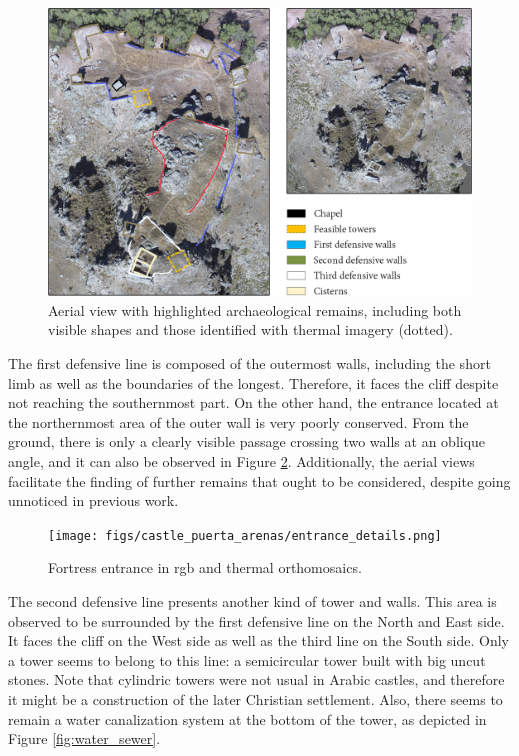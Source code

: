 \begin{figure}[htbp]
    \centering
    \includegraphics[width=\linewidth]{figs/castle_puerta_arenas/castle_annotations.png}
    \caption{Aerial view with highlighted archaeological remains, including both visible shapes and those identified with thermal imagery (dotted). }
    \label{fig:archaeological_remains_structure}
\end{figure}

The first defensive line is composed of the outermost walls, including the short limb as well as the boundaries of the longest. Therefore, it faces the cliff despite not reaching the southernmost part. On the other hand, the entrance located at the northernmost area of the outer wall is very poorly conserved. From the ground, there is only a clearly visible passage crossing two walls at an oblique angle, and it can also be observed in Figure \ref{fig:entrance_details}. Additionally, the aerial views facilitate the finding of further remains that ought to be considered, despite going unnoticed in previous work. 

\begin{figure}[htbp]
    \centering
    \texttt{[image: figs/castle\_puerta\_arenas/entrance\_details.png]}
    \caption{Fortress entrance in \acrshort{rgb} and thermal orthomosaics.}
    \label{fig:entrance_details}
\end{figure}

The second defensive line presents another kind of tower and walls. This area is observed to be surrounded by the first defensive line on the North and East side. It faces the cliff on the West side as well as the third line on the South side. Only a tower seems to belong to this line: a semicircular tower built with big uncut stones. Note that cylindric towers were not usual in Arabic castles, and therefore it might be a construction of the later Christian settlement. Also, there seems to remain a water canalization system at the bottom of the tower, as depicted in Figure \ref{fig:water_sewer}.

